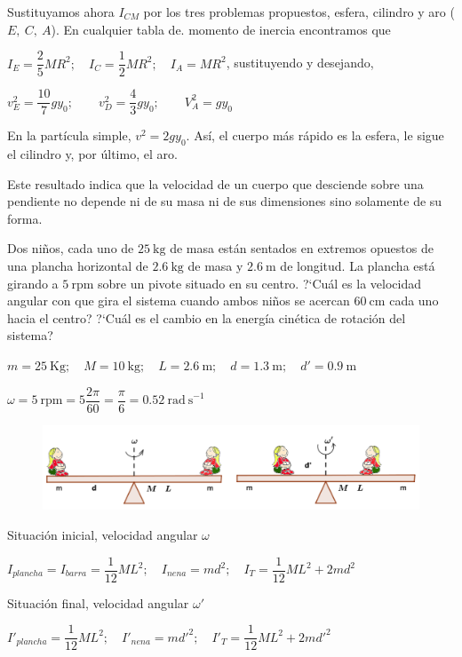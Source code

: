 Sustituyamos ahora $I_{CM}$ por los tres problemas propuestos, esfera, cilindro y aro ($E,\ C,\ A$). En cualquier tabla de. momento de inercia encontramos que

$I_E=\dfrac 2 5 MR^2;\quad I_C=\dfrac 1 2 MR^2;\quad I_A=MR^2$, sustituyendo y desejando,

$v_E^2=\dfrac {10}{7}gy_0;\qquad v^2_D=\dfrac 4 3 gy_0;\qquad V^2_A=gy_0$ 

En la partícula simple, $v^2=2gy_0$. Así, el cuerpo más rápido es la esfera, le sigue el cilindro y, por último, el aro.

Este resultado indica que la velocidad de un cuerpo que desciende sobre una pendiente no depende ni de su masa ni de sus dimensiones sino solamente de su forma.

\begin{prob}
Dos niños, cada uno de $25\ \mathrm{kg}$ de masa están sentados en extremos opuestos de una plancha horizontal de $2.6\ \mathrm{kg}$ de masa y $2.6\ \mathrm{m}$ de longitud. La plancha está girando a $5\ \mathrm{rpm}$ 	sobre un pivote situado en su centro. ?`Cuál es la velocidad angular con que gira el sistema cuando ambos niños se acercan $60\ \mathrm{cm}$ cada uno hacia el centro? ?`Cuál es el cambio en la energía cinética de rotación del sistema?
\end{prob}

$m=25\ \mathrm{Kg};\quad M=10\ \mathrm{kg};\quad L=2.6\ \mathrm{m};\quad d=1.3\ \mathrm{m}; \quad d'=0.9\ \mathrm{m}$

$\omega= 5 \ \mathrm{rpm}=5\dfrac {2\pi}{60} = \dfrac \pi 6 =0.52 \ \mathrm{rad\ s}^{-1}$

\begin{figure}[H]
	\centering
	\includegraphics[width=1\textwidth]{imagenes/imagenes16/T16IM19.png}
\end{figure}	

Situación inicial, velocidad angular $\omega$

$I_{plancha}=I_{barra}=\dfrac 1{12} ML^2; \quad I_{nena}=md^2;\quad I_T=\dfrac 1{12} ML^2+2md^2$

Situación final, velocidad angular $\omega'$

$I'_{plancha}=\dfrac 1{12} ML^2; \quad I'_{nena}=md'^2;\quad I'_T=\dfrac 1{12} ML^2+2md'^2$

